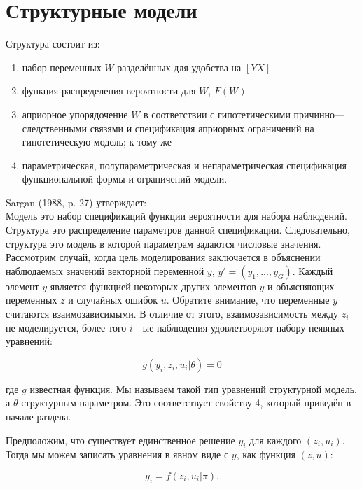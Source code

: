 	
\section{Структурные модели}

Структура состоит из:
\begin{enumerate}
\item набор переменных $W$ разделённых для удобства на $[Y X]$
\item функция распределения вероятности для $W$, $F(W)$
\item априорное упорядочение $W$ в соответствии с гипотетическими причинно---следственными связями и спецификация априорных ограничений на гипотетическую модель; к тому же
\item параметрическая, полупараметрическая и непараметрическая спецификация функциональной формы и ограничений модели.
\end{enumerate}


Sargan (1988, p. 27) утверждает: \\
Модель это набор спецификаций функции вероятности для набора наблюдений. Структура это распределение параметров данной спецификации. Следовательно, структура это модель в которой параметрам задаются числовые значения. \\
	Рассмотрим случай, когда цель моделирования заключается в объяснении наблюдаемых значений векторной переменной $y$, $y'= (y_{1}, ..., y_{G})$. Каждый элемент $y$ является функцией некоторых других элементов $y$ и объясняющих переменных $z$ и случайных ошибок $u$. Обратите внимание, что переменные $y$ считаются взаимозависимыми. В отличие от этого, взаимозависимость между $z_{i}$ не моделируется, более того $i$---ые наблюдения удовлетворяют набору неявных уравнений:
	
\begin{equation}
g(y_{i},z_{i},u_{i}|\theta)=0
\end{equation}

где $g$ известная функция. Мы называем такой тип уравнений структурной модель, а $\theta$ структурным параметром. Это соответствует свойству 4, который приведён в начале раздела. 


Предположим, что существует единственное решение $y_{i}$ для каждого $(z_{i},u_{i})$. Тогда мы можем записать уравнения в явном виде с $y$, как функция $(z, u)$:

\begin{equation}
y_{i}=f(z_{i},u_{i}|\pi).
\end{equation}


